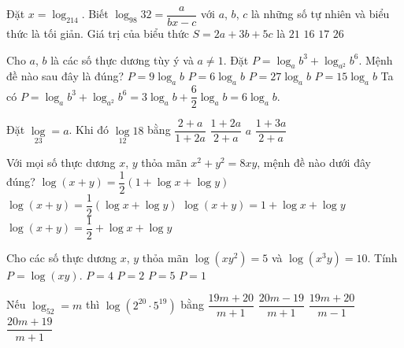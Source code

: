 \begin{ex}
	Đặt $x=\log_214$. Biết $\log_{98}32=\dfrac{a}{bx-c}$ với $a$, $b$, $c$ là những số tự nhiên và biểu thức là tối giản. Giá trị của biểu thức $S=2a+3b+5c$ là
	\choice
	{\True $21$}
	{$16$}
	{$17$}
	{$26$}
\end{ex}
\begin{ex}
	Cho $a$, $b$ là các số thực dương tùy ý và $a\ne 1$. Đặt $P=\log_ab^3 + \log_{a^2}b^6$. Mệnh đề nào sau
	đây là đúng?
	\choice
	{$P=9\log_a b$}
	{\True $P=6\log_a b$}
	{$P=27\log_a b$}
	{$P=15\log_a b$}
	\loigiai
	{
		Ta có $P=\log_ab^3 + \log_{a^2}b^6=3\log_a b+\dfrac{6}{2} \log_a b=6\log_a b$.
	}
\end{ex}
\begin{ex}
	Đặt $\log\limits_23=a$. Khi đó $\log\limits_{12}18$ bằng
	\choice
	{$\dfrac{2+a}{1+2a}$}
	{\True $\dfrac{1+2a}{2+a}$}
	{$a$}
	{$\dfrac{1+3a}{2+a}$}
\end{ex}
\begin{ex}
	Với mọi số thực dương $x$, $y$ thỏa mãn $x^2+y^2=8xy$, mệnh đề nào dưới đây đúng? 
	\choice
	{\True $\log(x+y)=\dfrac{1}{2}(1+\log x+\log y)$}
	{$\log(x+y)=\dfrac{1}{2}(\log x+\log y)$}
	{$\log(x+y)=1+\log x+\log y$}
	{$\log(x+y)=\dfrac{1}{2}+\log x+\log y$}
\end{ex}
\begin{ex}
	Cho các số thực dương $x$, $y$ thỏa mãn $\log(xy^2)=5$ và $\log(x^3y)=10$. Tính $P=\log(xy)$.
	\choice
	{\True $P=4$}
	{$P=2$}
	{$P=5$}
	{$P=1$}
\end{ex}
\begin{ex}
	Nếu $\log_52=m$ thì $\log\left(2^{20}\cdot 5^{19}\right)$ bằng	
	\choice
	{$\dfrac{19m+20}{m+1}$}
	{$\dfrac{20m-19}{m+1}$}
	{$\dfrac{19m+20}{m-1}$}
	{\True $\dfrac{20m+19}{m+1}$}
\end{ex}

